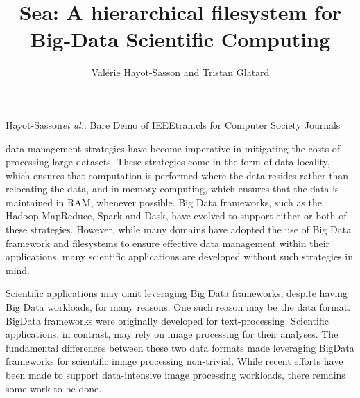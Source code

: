 \documentclass[10pt,journal,compsoc]{IEEEtran}
\begin{document}
\title{Sea: A hierarchical filesystem for Big-Data Scientific Computing}

\author{Val\'erie Hayot-Sasson and Tristan Glatard}

%
{Hayot-Sasson\MakeLowercase{\textit{et al.}}: Bare Demo of IEEEtran.cls for Computer Society Journals}
\IEEEtitleabstractindextext{%
\begin{abstract}
\end{abstract}
}


\maketitle


\IEEEdisplaynontitleabstractindextext
\IEEEpeerreviewmaketitle



 data-management strategies have become imperative in 
mitigating the costs of processing large datasets. These strategies come in the form
of data locality, which ensures that computation is performed where the data resides
rather than relocating the data, and in-memory computing, which ensures that the data is
maintained in RAM, whenever possible. Big Data frameworks, such as the Hadoop MapReduce, Spark and Dask,
have evolved to support either or both of these strategies.
However, while many domains have adopted the use of Big Data framework and filesystems to ensure effective data
management within their applications, many scientific applications are developed without such strategies in mind.

Scientific applications may omit leveraging Big Data frameworks, despite having Big Data workloads,
for many reasons. One such reason may be the data format. BigData frameworks were originally developed
for text-processing. Scientific applications, in contrast, may rely on image processing for their
analyses. The fundamental differences between these two data formats made leveraging BigData frameworks for
scientific image processing non-trivial. While recent efforts have been made to support data-intensive
image processing workloads, there remains some work to be done.
\end{document}
